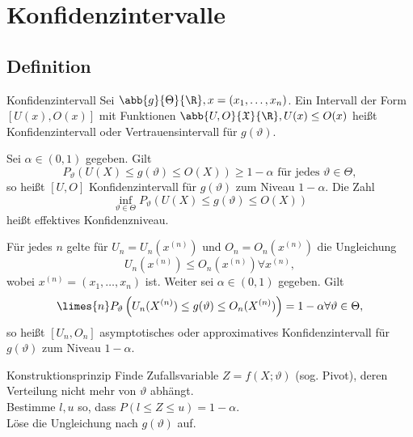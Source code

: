 \section{Konfidenzintervalle}

\subsection{Definition}

\begin{karte}{Konfidenzintervall}
Sei \(\abb{g}{\Theta}{\R}, x = (x_1, \ldots, x_n)\). Ein Intervall der Form \( [U(x), O(x)] \)
mit Funktionen \(\abb{U, O}{\mathfrak{X}}{\R}, U(x) \leq O(x)\) heißt Konfidenzintervall oder Vertrauensintervall 
für \(g(\vartheta)\). 

Sei \( \alpha \in (0,1) \) gegeben. Gilt 
\[ P_\vartheta(U(X) \leq g(\vartheta) \leq O(X)) \geq 1-\alpha \text{ für jedes } \vartheta \in \Theta, \]
so heißt \([U,O]\) Konfidenzintervall für \(g(\vartheta)\) zum Niveau \(1-\alpha\). 
Die Zahl 
\[ \inf_{\vartheta \in \Theta} P_\vartheta(U(X) \leq g(\vartheta) \leq O(X)) \]
heißt effektives Konfidenzniveau.

Für jedes \(n\) gelte für \(U_n = U_n(x^{(n)})\) und \(O_n = O_n(x^{(n)})\) die Ungleichung 
\[ U_n(x^{(n)}) \leq O_n(x^{(n)}) \forall x^{(n)}, \]
wobei \(x^{(n)} = (x_1, \ldots, x_n)\) ist. Weiter sei \(\alpha \in (0,1)\) gegeben. Gilt 
\[ \limes{n} P_\vartheta\left( U_n(X^{(n)}) \leq g(\vartheta) \leq O_n(X^{(n)}) \right) = 1-\alpha \forall \vartheta \in \Theta, \]
so heißt \([U_n, O_n]\) asymptotisches oder approximatives Konfidenzintervall für \(g(\vartheta)\) zum Niveau \(1-\alpha\).
\end{karte}

\begin{karte}{Konstruktionsprinzip}
Finde Zufallsvariable \(Z = f(X; \vartheta)\) (sog. Pivot), deren Verteilung nicht mehr von \(\vartheta\) abhängt. \\
Bestimme \(l,u\) so, dass \(P(l\leq Z \leq u) = 1-\alpha\).\\
Löse die Ungleichung nach \(g(\vartheta)\) auf.
\end{karte}

